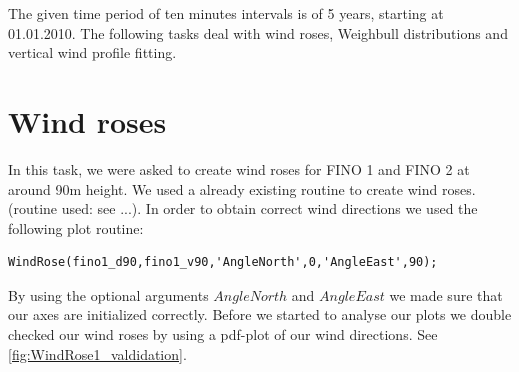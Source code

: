 \documentclass[10pt]{article}
\begin{document}
The given time period of ten minutes intervals is of 5 years, starting at 01.01.2010. The following tasks deal with wind roses, Weighbull distributions and vertical wind profile fitting.
\newpage
\section{Wind roses}
In this task, we were asked to create wind roses for FINO 1 and FINO 2 at around 90m height. We
used a already existing routine to create wind roses. (routine used: see ...).
In order to obtain correct wind directions we used the following plot routine:\\
\begin{lstlisting}
WindRose(fino1_d90,fino1_v90,'AngleNorth',0,'AngleEast',90);
\end{lstlisting}
By using the optional arguments $AngleNorth$ and $AngleEast$ we made sure that our axes are initialized correctly.
Before we started to analyse our plots we double checked our wind roses by using a pdf-plot of our wind directions. See \ref{fig:WindRose1_valdidation}.
\end{document}
